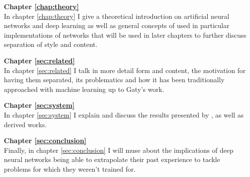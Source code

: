 \textbf{Chapter \ref{chap:theory}} \\[0.2em]
In chapter \ref{chap:theory} I give a theoretical introduction on artificial neural networks and deep learning as well as general concepts of used in particular implementations of networks that will be used in later chapters to further discuss separation of style and content.

\textbf{Chapter \ref{sec:related}} \\[0.2em]
In chapter \ref{sec:related} I talk in more detail form and content, the motivation for having them separated, its problematics and how it has been traditionally approached with machine learning up to Gaty's work.

\textbf{Chapter \ref{sec:system}} \\[0.2em]
In chapter \ref{sec:system} I explain and discuss the results presented by \citet{Gatys2015}, as well as derived works.

\textbf{Chapter \ref{sec:conclusion}} \\[0.2em]
Finally, in chapter \ref{sec:conclusion} I will muse about the implications of deep neural networks being able to extrapolate their past experience to tackle problems for which they weren't trained for.
